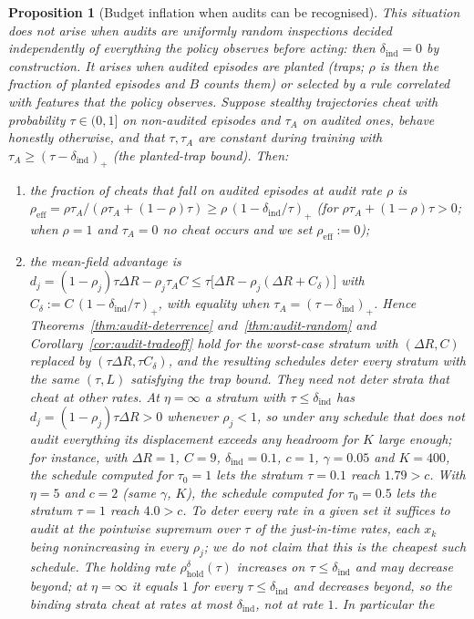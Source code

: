 \documentclass[11pt,a4paper]{article}
\newtheorem{proposition}[theorem]{Proposition}
\begin{document}
\begin{proposition}[Budget inflation when audits can be recognised]
\label{prop:audit-indist}
This situation does not arise when audits are uniformly random inspections decided independently of everything the policy observes before acting: then $\delta_{\mathrm{ind}}=0$ by construction. It arises when audited episodes are planted (traps; $\rho$ is then the fraction of planted episodes and $B$ counts them) or selected by a rule correlated with features that the policy observes.
Suppose stealthy trajectories cheat with probability $\tau\in(0,1]$ on
non-audited episodes and $\tau_A$ on audited ones, behave honestly otherwise,
and that $\tau,\tau_A$ are constant during training with
$\tau_A\ge(\tau-\delta_{\mathrm{ind}})_+$ (the planted-trap bound). Then:
\begin{enumerate}
\item[\textup{(a)}] the fraction of cheats that fall on audited episodes at
audit rate $\rho$ is
$\rho_{\mathrm{eff}}=\rho\tau_A/(\rho\tau_A+(1-\rho)\tau)\ge\rho\,(1-\delta_{\mathrm{ind}}/\tau)_+$ (for $\rho\tau_A+(1-\rho)\tau>0$; when $\rho=1$ and $\tau_A=0$ no cheat occurs and we set $\rho_{\mathrm{eff}}:=0$);
\item[\textup{(b)}] the mean-field advantage is
$d_j=(1-\rho_j)\tau\Delta R-\rho_j\tau_AC\le\tau\bigl[\Delta R-\rho_j(\Delta R+C_\delta)\bigr]$
with $C_\delta:=C\,(1-\delta_{\mathrm{ind}}/\tau)_+$, with equality when
$\tau_A=(\tau-\delta_{\mathrm{ind}})_+$. Hence
Theorems~\ref{thm:audit-deterrence} and~\ref{thm:audit-random} and
Corollary~\ref{cor:audit-tradeoff} hold for the worst-case stratum with
$(\Delta R,C)$ replaced by $(\tau\Delta R,\tau C_\delta)$, and the resulting
schedules deter every stratum with the same $(\tau,L)$ satisfying the trap bound. They need not deter strata that cheat at other rates. At $\eta=\infty$ a stratum with $\tau\le\delta_{\mathrm{ind}}$ has $d_j=(1-\rho_j)\tau\Delta R>0$ whenever $\rho_j<1$, so under any schedule that does not audit everything its displacement exceeds any headroom for $K$ large enough; for instance, with $\Delta R=1$, $C=9$, $\delta_{\mathrm{ind}}=0.1$, $c=1$, $\gamma=0.05$ and $K=400$, the schedule computed for $\tau_0=1$ lets the stratum $\tau=0.1$ reach $1.79>c$. With $\eta=5$ and $c=2$ (same $\gamma$, $K$), the schedule computed for $\tau_0=0.5$ lets the stratum $\tau=1$ reach $4.0>c$. To deter every rate in a given set it suffices to audit at the pointwise supremum over $\tau$ of the just-in-time rates, each $x_k$ being nonincreasing in every $\rho_j$; we do not claim that this is the cheapest such schedule. The holding rate $\rho^{\delta}_{\mathrm{hold}}(\tau)$ increases on $\tau\le\delta_{\mathrm{ind}}$ and may decrease beyond; at $\eta=\infty$ it equals $1$ for every $\tau\le\delta_{\mathrm{ind}}$ and decreases beyond, so the binding strata cheat at rates at most $\delta_{\mathrm{ind}}$, not at rate $1$. In particular the

\end{enumerate}
\end{proposition}
\end{document}
